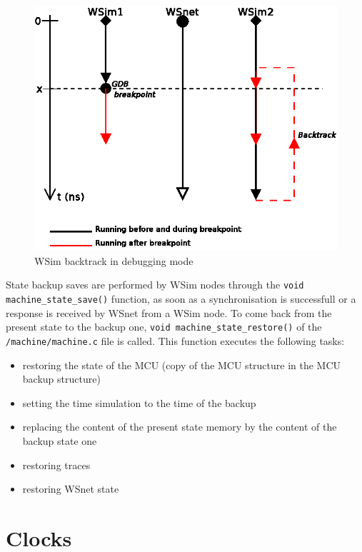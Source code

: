 \documentclass[a4paper,10pt]{report}
\begin{document}
\begin{figure}
\begin{center}
  \includegraphics[scale=1]{figures/wsim_backtrack2.eps}
\end{center}
\caption{WSim backtrack in debugging mode}
\label{wsim backtrack 2}
\end{figure}

State backup saves are performed by WSim nodes through the \verb$void machine_state_save()$ function, as soon as a synchronisation is successfull or a response is received by WSnet from a WSim node. To come back from the present state to the backup one, \verb$void machine_state_restore()$ of the \verb$/machine/machine.c$ file is called. This function executes the following tasks:
\begin{itemize}
  \item restoring the state of the MCU (copy of the MCU structure in the MCU backup structure)
  \item setting the time simulation to the time of the backup
  \item replacing the content of the present state memory by the content of the backup state one
  \item restoring traces
  \item restoring WSnet state
\end{itemize}


\section{Clocks}
\end{document}
